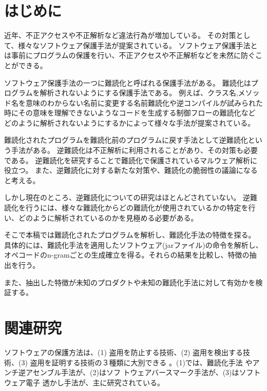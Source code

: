 \documentclass[12pt,twoside]{jreport}
\begin{document}
\listoffigures         %
\listoftables          %


%
%
%
\chapter{はじめに}

近年、不正アクセスや不正解析など違法行為が増加している。
その対策として、様々なソフトウェア保護手法が提案されている。
ソフトウェア保護手法とは事前にプログラムの保護を行い、不正アクセスや不正解析などを未然に防ぐことができる。

ソフトウェア保護手法の一つに難読化と呼ばれる保護手法がある。
難読化はプログラムを解析されないようにする保護手法である。
例えば、クラス名,メソッド名を意味のわからない名前に変更する名前難読化や逆コンパイルが試みられた時にその意味を理解できないようなコードを生成する制御フローの難読化など
どのように解析されないようにするかによって様々な手法が提案されている。


難読化されたプログラムを難読化前のプログラムに戻す手法として逆難読化という手法がある。
逆難読化は不正解析に利用されることがあり、その対策も必要である。
逆難読化を研究することで難読化で保護されているマルウェア解析に役立つ。
また、逆難読化に対する新たな対策や、難読化の脆弱性の議論になると考える。

しかし現在のところ、逆難読化についての研究はほとんどされていない。
逆難読化を行うには、様々な難読化からどの難読化が使用されているかの特定を行い、どのように解析されているのかを見極める必要がある。

そこで本稿では難読化されたプログラムを解析し、難読化手法の特徴を探る。
具体的には、難読化手法を適用したソフトウェア(jarファイル)の命令を解析し、オペコードのn-gramごとの生成確立を得る。それらの結果を比較し、特徴の抽出を行う。

また、抽出した特徴が未知のプロダクトや未知の難読化手法に対して有効かを検証する。

\chapter{関連研究}\label{sect:related}
ソフトウェアの保護方法は、(1) 盗用を防止する技術、(2) 盗用を検出する技
術、(3) 盗用を証明する技術の３種類に大別できる
\cite{collberg09surreptitious}。(1)では、難読化手法
\cite{tyma00patent,monden97ieice}やアンチ逆アセンブル手法が、(2)はソフ
トウェアバースマーク手法\cite{tamada05ieice}が、(3)はソフトウェア電子
透かし手法\cite{collberg99popl}が、主に研究されている。
\end{document}
